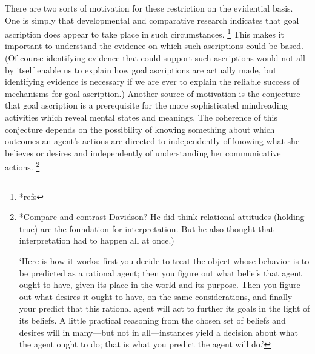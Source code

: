 \documentclass[12pt,a4paper]{extarticle}
\begin{document}
There are two sorts of motivation for these restriction on the evidential basis.
One is simply that developmental and comparative research indicates that goal ascription does appear to take place  in such circumstances.%
\footnote{
*refs
}
This makes it important to understand the evidence on which such ascriptions could be based.
(Of course 
identifying evidence that could support such ascriptions 
would not all by itself enable us to explain how goal ascriptions are actually made, 
but identifying evidence is necessary if we are ever to explain the reliable success of mechanisms for goal ascription.)
Another source of motivation is the conjecture that goal ascription is a prerequisite for the more sophisticated mindreading activities which reveal mental states and meanings.
The coherence of this conjecture depends on the possibility of knowing something about which outcomes an agent's actions are directed to independently of knowing what she believes or desires and independently of understanding her communicative actions.%
\footnote{
*Compare and contrast Davidson?
He did think relational attitudes (holding true) are the foundation for interpretation.
But he also thought that interpretation had to happen all at once.)

\citet[p.\ 17]{Dennett:1987sf} `Here is how it works: first you decide to treat the object whose behavior is to be predicted as a rational agent; then you figure out what beliefs that agent ought to have, given its place in the world and its purpose.   Then you figure out what desires it ought to have, on the same considerations, and finally your predict that this rational agent will act to further its goals in the light of its beliefs.  A little practical reasoning from the chosen set of beliefs and desires will in many—but not in all—instances yield a decision about what the agent ought to do; that is what you predict the agent will do.'
}
\end{document}
